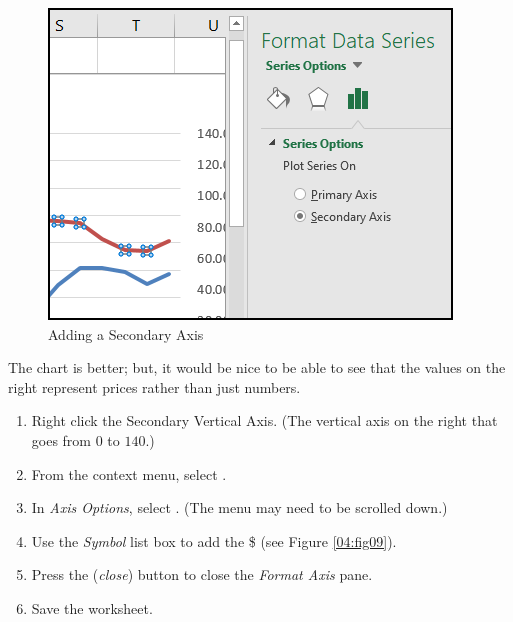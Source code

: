 \begin{figure}[H]
	\centering
	\includegraphics[width=\maxwidth{.75\linewidth}]{gfx/ch04_fig08}
	\caption{Adding a Secondary Axis}
	\label{04:fig08}
\end{figure}

The chart is better; but, it would be nice to be able to see that the values on the right represent prices rather than just numbers.

\begin{enumerate}
	\item Right click the Secondary Vertical Axis. (The vertical axis on the right that goes from $ 0 $ to $ 140 $.)
	\item From the context menu, select .
	\item In \textit{Axis Options}, select . (The menu may need to be scrolled down.)
	\item Use the \textit{Symbol} list box to add the \$ (see Figure \ref{04:fig09}).
	\item Press the  (\textit{close}) button to close the \textit{Format Axis} pane.
	\item Save the worksheet.
\end{enumerate}

